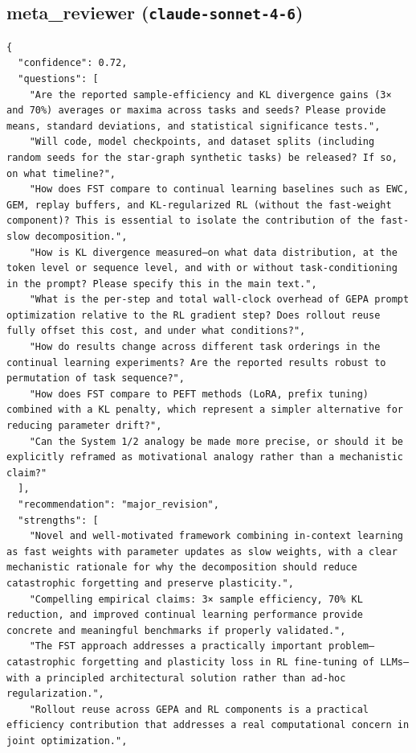 \documentclass[11pt]{article}
\begin{document}
\subsection*{meta_reviewer (\texttt{claude-sonnet-4-6})}
\begin{verbatim}
{
  "confidence": 0.72,
  "questions": [
    "Are the reported sample-efficiency and KL divergence gains (3× and 70%) averages or maxima across tasks and seeds? Please provide means, standard deviations, and statistical significance tests.",
    "Will code, model checkpoints, and dataset splits (including random seeds for the star-graph synthetic tasks) be released? If so, on what timeline?",
    "How does FST compare to continual learning baselines such as EWC, GEM, replay buffers, and KL-regularized RL (without the fast-weight component)? This is essential to isolate the contribution of the fast-slow decomposition.",
    "How is KL divergence measured—on what data distribution, at the token level or sequence level, and with or without task-conditioning in the prompt? Please specify this in the main text.",
    "What is the per-step and total wall-clock overhead of GEPA prompt optimization relative to the RL gradient step? Does rollout reuse fully offset this cost, and under what conditions?",
    "How do results change across different task orderings in the continual learning experiments? Are the reported results robust to permutation of task sequence?",
    "How does FST compare to PEFT methods (LoRA, prefix tuning) combined with a KL penalty, which represent a simpler alternative for reducing parameter drift?",
    "Can the System 1/2 analogy be made more precise, or should it be explicitly reframed as motivational analogy rather than a mechanistic claim?"
  ],
  "recommendation": "major_revision",
  "strengths": [
    "Novel and well-motivated framework combining in-context learning as fast weights with parameter updates as slow weights, with a clear mechanistic rationale for why the decomposition should reduce catastrophic forgetting and preserve plasticity.",
    "Compelling empirical claims: 3× sample efficiency, 70% KL reduction, and improved continual learning performance provide concrete and meaningful benchmarks if properly validated.",
    "The FST approach addresses a practically important problem—catastrophic forgetting and plasticity loss in RL fine-tuning of LLMs—with a principled architectural solution rather than ad-hoc regularization.",
    "Rollout reuse across GEPA and RL components is a practical efficiency contribution that addresses a real computational concern in joint optimization.",

\end{verbatim}
\end{document}
